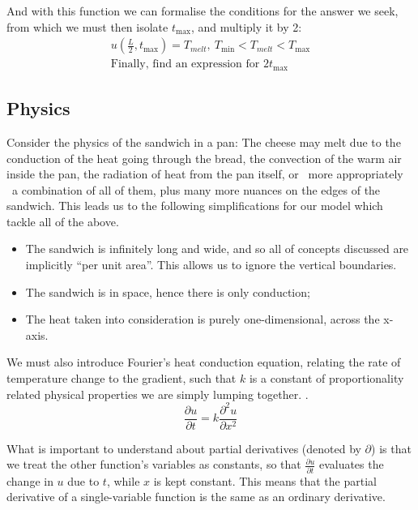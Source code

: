 And with this function we can formalise the conditions for the answer we seek, from which we must then isolate $t_{\max}$, and multiply it by 2:
\begin{equation*}
\begin{split}
u(\frac{L}{2}, t_{\max}) = T_{melt} ,\ T_{\min} < T_{melt} < T_{\max} \\
\text{Finally, find an expression for }2t_{\max}
\end{split}
\end{equation*}

\subsection{Physics}\label{Physics}
Consider the physics of the sandwich in a pan: The cheese may melt due to the conduction of the heat going through the bread, the convection of the warm air inside the pan, the radiation of heat from the pan itself, or \textendash\ more appropriately \textendash\ a combination of all of them, plus many more nuances on the edges of the sandwich. 
This leads us to the following simplifications for our model which tackle all of the above.
\begin{itemize}
	\item The sandwich is infinitely long and wide, and so all of concepts discussed are implicitly ``per unit area''. This allows us to ignore the vertical boundaries.
	\item The sandwich is in space, hence there is only conduction;
	\item The heat taken into consideration is purely one-dimensional, across the x-axis.
\end{itemize}

We must also introduce Fourier's heat conduction equation, relating the rate of temperature change to the gradient, such that $k$ is a constant of proportionality related physical properties we are simply lumping together. \citep[pp.17-19]{Lienhard2001Heat}.
\begin{equation}\label{eq:Fourier}
	\frac{\partial u}{\partial t} = k \frac{\partial ^2 u}{\partial x^2}
\end{equation}

What is important to understand about partial derivatives (denoted by $\partial$) is that we treat the other function's variables as constants, so that $\frac{\partial u}{\partial t}$ evaluates the change in $u$ due to $t$, while $x$ is kept constant. 
This means that the partial derivative of a single-variable function is the same as an ordinary derivative.

